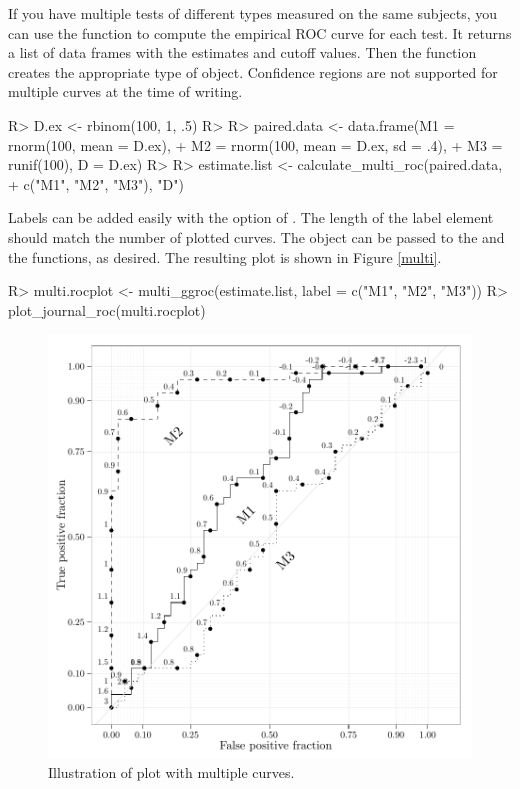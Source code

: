 \documentclass[codesnippet]{jss}
\begin{document}
If you have multiple tests of different types measured on the same
subjects, you can use the  function to compute
the empirical ROC curve for each test. It returns a list of data frames
with the estimates and cutoff values. Then the 
function creates the appropriate type of  object.
Confidence regions are not supported for multiple curves at the time of
writing.

\begin{Schunk}
\begin{Sinput}
R> D.ex <- rbinom(100, 1, .5)
R> 
R> paired.data <- data.frame(M1 = rnorm(100, mean = D.ex), 
+                        M2 = rnorm(100, mean = D.ex, sd = .4), 
+                        M3 = runif(100), D = D.ex)
R> 
R> estimate.list <- calculate_multi_roc(paired.data, 
+                                      c("M1", "M2", "M3"), "D")
\end{Sinput}
\end{Schunk}

Labels can be added easily with the  option of
. The length of the label element should match the
number of plotted curves. The  object can be passed to
the  and the 
functions, as desired. The resulting plot is shown in Figure
\ref{multi}.

\begin{Schunk}
\begin{Sinput}
R> multi.rocplot <- multi_ggroc(estimate.list, label = c("M1", "M2", "M3"))
R> plot_journal_roc(multi.rocplot)
\end{Sinput}
\begin{figure}
\includegraphics{figure/multi2-1} \caption{Illustration of  plot with multiple curves. \label{multi} }\label{fig:multi2}
\end{figure}
\end{Schunk}
\end{document}

